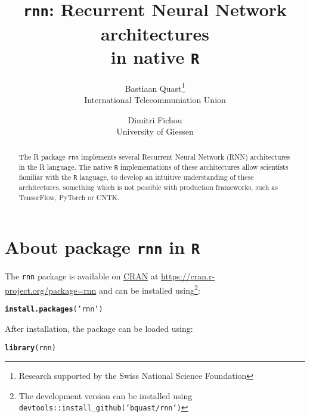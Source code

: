 \documentclass[english,article]{article}\usepackage[]{graphicx}\usepackage[]{color}
\makeatletter
\newcommand{\hlstr}[1]{\textcolor[rgb]{0.192,0.494,0.8}{#1}}%
\newcommand{\hlstd}[1]{\textcolor[rgb]{0.345,0.345,0.345}{#1}}%
\newcommand{\hlkwd}[1]{\textcolor[rgb]{0.737,0.353,0.396}{\textbf{#1}}}%
\newenvironment{kframe}{%
 \def\at@end@of@kframe{}%
 \ifinner\ifhmode%
  \def\at@end@of@kframe{\end{minipage}}%
  \begin{minipage}{\columnwidth}%
 \fi\fi%
 \def\FrameCommand##1{\hskip\@totalleftmargin \hskip-\fboxsep
 \colorbox{shadecolor}{##1}\hskip-\fboxsep
     \hskip-\linewidth \hskip-\@totalleftmargin \hskip\columnwidth}%
 \MakeFramed {\advance\hsize-\width
   \@totalleftmargin\z@ \linewidth\hsize
   \@setminipage}}%
 {\par\unskip\endMakeFramed%
 \at@end@of@kframe}
\newenvironment{knitrout}{}{} %
\providecommand*{\code}[1]{\texttt{#1}}
\makeatother
\begin{document}
\title{\code{rnn}: Recurrent Neural Network architectures\\
in native \code{R}}
\author{Bastiaan Quast\thanks{Research supported by the Swiss National Science Foundation}\\
International Telecommuniation Union \and Dimitri Fichou\\
University of Giessen}
\maketitle
\begin{abstract}
\noindent The R package \code{rnn} implements several Recurrent Neural
Network (RNN) architectures in the R language. The native \code{R}
implementations of these architectures allow scientists familiar with
the \code{R} language, to develop an intuitive understanding of these
architectures, something which is not possible with production frameworks,
such as TensorFlow, PyTorch or CNTK. 
\end{abstract}


\section{About package \protect\code{rnn} in \protect\code{R} }

The \code{rnn} package is available on \href{https://cran.r-project.org/}{CRAN}
at \href{https://cran.r-project.org/package\%3Drnn}{https://cran.r-project.org/package=rnn}
and can be installed using\footnote{The development version can be installed using \code{devtools::install\_github('bquast/rnn')}}:

\begin{knitrout}
\color{fgcolor}\begin{kframe}
\begin{alltt}
\hlkwd{install.packages}\hlstd{(}\hlstr{'rnn'}\hlstd{)}
\end{alltt}
\end{kframe}
\end{knitrout}

After installation, the package can be loaded using:

\begin{knitrout}
\color{fgcolor}\begin{kframe}
\begin{alltt}
\hlkwd{library}\hlstd{(rnn)}
\end{alltt}
\end{kframe}
\end{knitrout}
\end{document}
